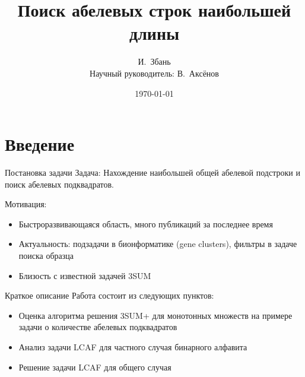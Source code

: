 \documentclass[hyperref=unicode,graphics=pdflatex,12pt]{beamer}
\begin{document}
\title{Поиск абелевых строк наибольшей длины}
\author{И.~Збань\\
Научный руководитель: В.~Аксёнов}

\date{\today}
\frame{\titlepage}                                   

\section{Введение}

\begin{frame}{Постановка задачи}
\hspace{0.5cm}
Задача: Нахождение наибольшей общей абелевой подстроки и поиск абелевых подквадратов.

\vspace{0.5cm}

\hspace{0.5cm}
\alert{Мотивация:}
\begin{itemize}
\item<3-> Быстроразвивающаяся область, много публикаций за последнее время
\item<4-> Актуальность: подзадачи в бионформатике (gene clusters), фильтры в задаче поиска образца
\item<5-> Близость с известной задачей 3SUM

\end{itemize}
\end{frame}

\begin{frame}{Краткое описание}
\hspace{0.5cm}
Работа состоит из следующих пунктов:
\begin{itemize}
\item<2-> Оценка алгоритма решения 3SUM+ для монотонных множеств на примере задачи о количестве абелевых подквадратов
\item<3-> Анализ задачи LCAF для частного случая бинарного алфавита
\item<4-> Решение задачи LCAF для общего случая
\end{itemize}
\end{frame}
\end{document}

